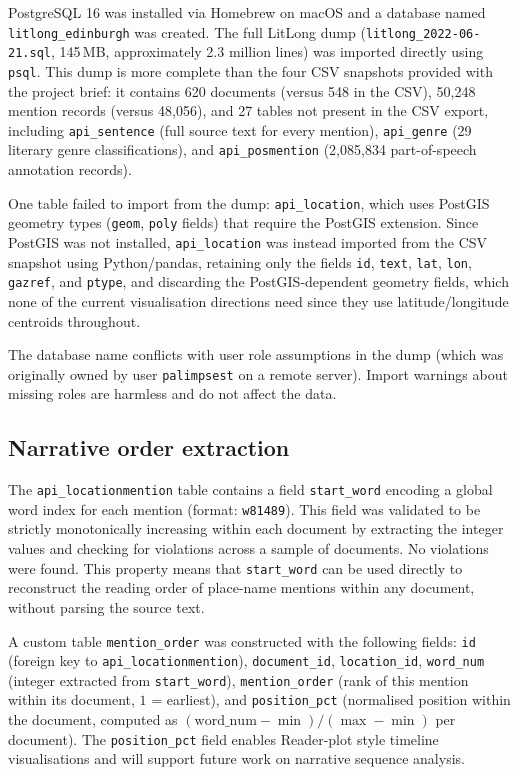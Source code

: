 \documentclass[logo,msc]{infthesis}
\begin{document}
PostgreSQL 16 was installed via Homebrew on macOS and a database named \texttt{litlong\_edinburgh} was created. The full LitLong dump (\texttt{litlong\_2022-06-21.sql}, 145\,MB, approximately 2.3 million lines) was imported directly using \texttt{psql}. This dump is more complete than the four CSV snapshots provided with the project brief: it contains 620 documents (versus 548 in the CSV), 50,248 mention records (versus 48,056), and 27 tables not present in the CSV export, including \texttt{api\_sentence} (full source text for every mention), \texttt{api\_genre} (29 literary genre classifications), and \texttt{api\_posmention} (2,085,834 part-of-speech annotation records).
 
One table failed to import from the dump: \texttt{api\_location}, which uses PostGIS geometry types (\texttt{geom}, \texttt{poly} fields) that require the PostGIS extension. Since PostGIS was not installed, \texttt{api\_location} was instead imported from the CSV snapshot using Python/pandas, retaining only the fields \texttt{id}, \texttt{text}, \texttt{lat}, \texttt{lon}, \texttt{gazref}, and \texttt{ptype}, and discarding the PostGIS-dependent geometry fields, which none of the current visualisation directions need since they use latitude/longitude centroids throughout.
 
The database name conflicts with user role assumptions in the dump (which was originally owned by user \texttt{palimpsest} on a remote server). Import warnings about missing roles are harmless and do not affect the data.
 
\subsection*{Narrative order extraction}
 
The \texttt{api\_locationmention} table contains a field \texttt{start\_word} encoding a global word index for each mention (format: \texttt{w81489}). This field was validated to be strictly monotonically increasing within each document by extracting the integer values and checking for violations across a sample of documents. No violations were found. This property means that \texttt{start\_word} can be used directly to reconstruct the reading order of place-name mentions within any document, without parsing the source text.
 
A custom table \texttt{mention\_order} was constructed with the following fields: \texttt{id} (foreign key to \texttt{api\_locationmention}), \texttt{document\_id}, \texttt{location\_id}, \texttt{word\_num} (integer extracted from \texttt{start\_word}), \texttt{mention\_order} (rank of this mention within its document, $1$ = earliest), and \texttt{position\_pct} (normalised position within the document, computed as $(\text{word\_num} - \min) / (\max - \min)$ per document). The \texttt{position\_pct} field enables Reader-plot style timeline visualisations and will support future work on narrative sequence analysis.
 
\end{document}
